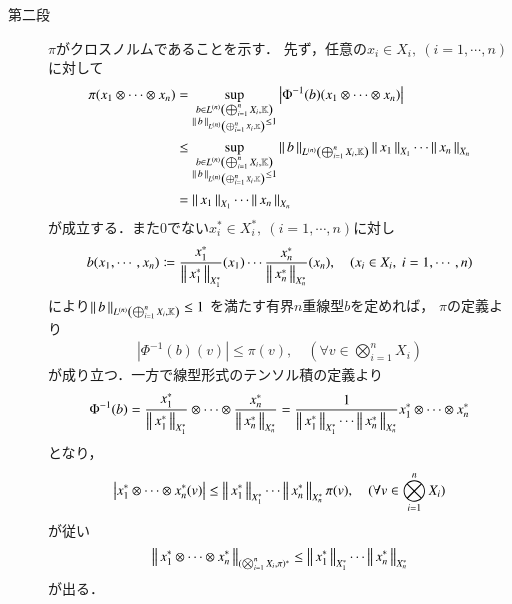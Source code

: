 \begin{prf}
\begin{description}
			\item[第二段]
				$\pi$がクロスノルムであることを示す．
				先ず，任意の$x_i \in X_i,\ (i=1,\cdots,n)$に対して
				\begin{align}
					\pi(x_1 \otimes \cdots \otimes x_n) 
					&= \sup{\substack{b \in \ContLn{\bigoplus_{i=1}^n X_i}{\K}{n} \\ \Norm{b}{\ContLn{\bigoplus_{i=1}^n X_i}{\K}{n}} \leq 1}}{\left| \Phi^{-1}(b)(x_1 \otimes \cdots \otimes x_n) \right|} \\
					&\leq \sup{\substack{b \in \ContLn{\bigoplus_{i=1}^n X_i}{\K}{n} \\ \Norm{b}{\ContLn{\bigoplus_{i=1}^n X_i}{\K}{n}} \leq 1}}{\Norm{b}{\ContLn{\bigoplus_{i=1}^n X_i}{\K}{n}}\Norm{x_1}{X_1} \cdots \Norm{x_n}{X_n}} \\
					&= \Norm{x_1}{X_1} \cdots \Norm{x_n}{X_n}
				\end{align}
				が成立する．また0でない$x_i^* \in X_i^*,\ (i=1,\cdots,n)$に対し
				\begin{align}
					b(x_1,\cdots,x_n) 
					\coloneqq \frac{x_1^*}{\Norm{x_1^*}{X_1^*}}(x_1) \cdots \frac{x_n^*}{\Norm{x_n^*}{X_n^*}}(x_n),
					\quad (x_i \in X_i,\ i=1,\cdots,n)
				\end{align}
				により$\Norm{b}{\ContLn{\bigoplus_{i=1}^n X_i}{\K}{n}} \leq 1$
				を満たす有界$n$重線型$b$を定めれば，
				$\pi$の定義より
				\begin{align}
					\left| \Phi^{-1}(b)(v) \right| \leq \pi(v),
					\quad (\forall v \in \bigotimes_{i=1}^n X_i)
				\end{align}
				が成り立つ．一方で線型形式のテンソル積の定義より
				\begin{align}
					\Phi^{-1}(b) 
					= \frac{x_1^*}{\Norm{x_1^*}{X_1^*}} 
						\otimes \cdots \otimes \frac{x_n^*}{\Norm{x_n^*}{X_n^*}}
					= \frac{1}{\Norm{x_1^*}{X_1^*} \cdots \Norm{x_n^*}{X_n^*}} 
						x_1^* \otimes \cdots \otimes x_n^*
				\end{align}
				となり，
				\begin{align}
					\left| x_1^* \otimes \cdots \otimes x_n^*(v) \right| 
						\leq \Norm{x_1^*}{X_1^*} \cdots \Norm{x_n^*}{X_n^*} \pi(v),
					\quad (\forall v \in \bigotimes_{i=1}^n X_i)
				\end{align}
				が従い
				\begin{align}
					\Norm{x_1^* \otimes \cdots \otimes x_n^*}{(\bigotimes_{i=1}^n X_i,\pi)^*} 
					\leq \Norm{x_1^*}{X_1^*} \cdots \Norm{x_n^*}{X_n^*}
				\end{align}
				が出る．
				

\end{description}
\end{prf}
